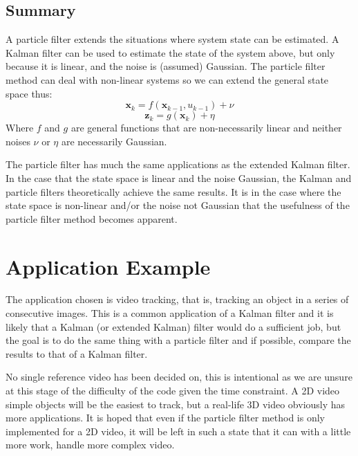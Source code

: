 \documentclass[11pt]{article}
\begin{document}

\subsection{Summary}
A particle filter extends the situations where system state can be estimated. A
Kalman filter can be used to estimate the state of the system above, but only
because it is linear, and the noise is (assumed) Gaussian. The particle filter
method can deal with non-linear systems so we can extend the general state
space thus:
\begin{equation}
\mathbf{x}_{k} = f(\mathbf{x}_{k-1}, u_{k-1}) + \nu
\end{equation}
\begin{equation}
\mathbf{z}_{k} = g(\mathbf{x}_{k}) + \eta
\end{equation}
Where $f$ and $g$ are general functions that are non-necessarily linear and
neither noises $\nu$ or $\eta$ are necessarily Gaussian.

The particle filter has much the same applications as the extended Kalman
filter. In the case that the state space is linear and the noise Gaussian, the
Kalman and particle filters theoretically achieve the same results. It is in
the case where the state space is non-linear and/or the noise not Gaussian that
the usefulness of the particle filter method becomes apparent.

\section{Application Example}\label{sec:application}
The application chosen is video tracking, that is, tracking an object in a
series of consecutive images.  This is a common application of a Kalman filter
and it is likely that a Kalman (or extended Kalman) filter would do a sufficient
job, but the goal is to do the same thing with a particle filter and if
possible, compare the results to that of a Kalman filter.

No single reference video has been decided on, this is intentional as we are
unsure at this stage of the difficulty of the code given the time constraint. A
2D video simple objects will be the easiest to track, but a real-life 3D video
obviously has more applications. It is hoped that even if the particle filter
method is only implemented for a 2D video, it will be left in such a state that
it can with a little more work, handle more complex video.
\end{document}
